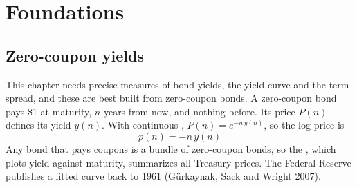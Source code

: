 \section{Foundations}
\label{sec:07-foundations}

\subsection{Zero-coupon yields}

This chapter needs precise measures of bond yields, the yield curve and the term spread, and these are best built from zero-coupon bonds. A zero-coupon bond pays \$1 at maturity, $n$ years from now, and nothing before. Its price $P(n)$ defines its yield $y(n)$. With continuous , $P(n) = e^{-n\,y(n)}$, so the log price is
\begin{equation}
  p(n) = -n\,y(n)
  \label{eq:07-logprice}
\end{equation}
Any bond that pays coupons is a bundle of zero-coupon bonds, so the , which plots yield against maturity, summarizes all Treasury prices. The Federal Reserve publishes a fitted curve back to 1961 (G\"urkaynak, Sack and Wright 2007).


